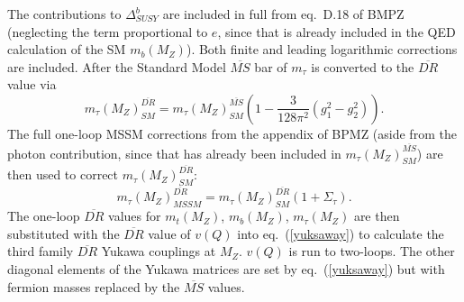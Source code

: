 \documentclass[]{article}
\begin{document}
The contributions to $\Delta_{SUSY}^b$ are
included in full from eq.~D.18 of BMPZ (neglecting the term proportional to
$e$, since that is already included in the QED calculation of the SM 
$m_b(M_Z)$).
Both finite and leading logarithmic
corrections are included.
After the Standard Model $\overline{MS}$ bar of $m_\tau$ is converted to the
$\overline{DR}$ value via
\begin{equation}
m_\tau(M_Z)^{\overline{DR}}_{SM} = m_\tau(M_Z)^{\overline{MS}}_{SM}
\left( 1 - \frac{3}{128 \pi^2} (g_1^2 - g_2^2)\right).
\end{equation}
The full one-loop MSSM corrections from the appendix 
of BPMZ 
(aside from the photon
contribution, since that has already been included in
$m_\tau(M_Z)^{\overline{MS}}_{SM}$) 
are then used to correct
$m_\tau(M_Z)^{\overline{DR}}_{SM}$:
\begin{equation}
m_\tau(M_Z)^{\overline{DR}}_{MSSM} = m_\tau(M_Z)^{\overline{DR}}_{SM}
 (1 + \Sigma_\tau).
\end{equation}
The one-loop $\overline{DR}$ values for $m_t(M_Z)$, $m_b(M_Z)$,
$m_{\tau}(M_Z)$ are then substituted with the $\overline{DR}$ value
of $v(Q)$ into eq.~(\ref{yuksaway}) to calculate the third family
$\overline{DR}$ Yukawa couplings at $M_Z$.
$v(Q)$ is run to two-loops.
The other diagonal elements of the Yukawa matrices are set by
eq.~(\ref{yuksaway}) but with fermion masses replaced by the $\overline{MS}$
values. 
\end{document}

